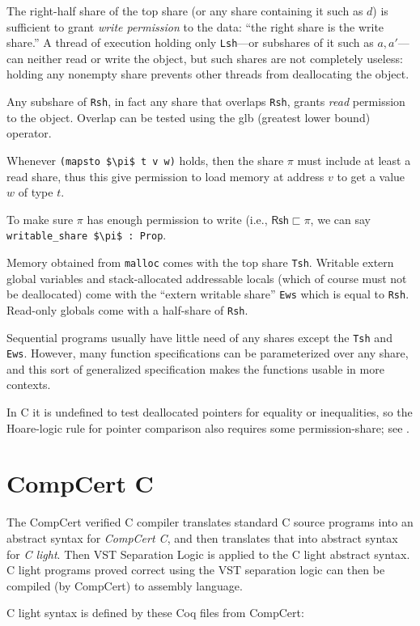 \documentclass[12pt,fleqn,openany,oneside,showtrims]{memoir}
\newcommand{\ychapter}[2]{\chapter[#1]{#1 \hfill \normalsize #2}}
\begin{document}
The right-half share of the top share (or any share containing it such
as $d$) is sufficient to grant \emph{write permission} to the data:
``the right share is the write share.''  A thread of execution holding
only \lstinline{Lsh}---or subshares of it such as $a,a'$---can neither
read or write the object, but such shares are not completely useless:
holding any nonempty share prevents other threads from deallocating
the object.

Any subshare of \lstinline{Rsh}, in fact any share that overlaps
 \lstinline{Rsh}, grants \emph{read} permission to the object.
Overlap can be tested using the glb (greatest lower bound) operator.

Whenever \lstinline{(mapsto $\pi$ t v w)} holds, then the share $\pi$
must include at least a read share, thus this give permission to load
memory at address $v$ to get a value $w$ of type $t$.

To make sure $\pi$ has enough permission to write (i.e., 
$\mathsf{Rsh} \sqsubset \pi$, we can say \lstinline{writable_share $\pi$ : Prop}.

Memory obtained from \lstinline{malloc} comes with the top share
\lstinline{Tsh}.  Writable extern global variables
and stack-allocated addressable locals (which of course
must not be deallocated) come with the ``extern writable share'' 
\lstinline{Ews} which is equal to \lstinline{Rsh}.
Read-only globals come with a half-share of \lstinline{Rsh}.

Sequential programs usually have little need of any shares except
the \lstinline{Tsh} and \lstinline{Ews}.  However, many function 
specifications can be parameterized over any share, and this sort
of generalized specification makes the functions usable in more contexts.

In C it is undefined to test deallocated pointers for equality or inequalities,
so the Hoare-logic rule for pointer comparison also requires some
permission-share; see .


\ychapter{CompCert C}{}

The CompCert verified C compiler translates standard C source programs
into an abstract syntax for \emph{CompCert C},
and then translates that into abstract syntax
for \emph{C light}.  
Then VST Separation Logic is applied to the C light abstract syntax.
C light programs proved correct using the VST separation logic
can then be compiled (by CompCert) to assembly language.

C light syntax is defined by these Coq files from CompCert:
\end{document}
